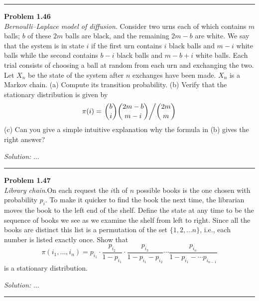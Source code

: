 \documentclass[a4paper, 11pt]{article}
\newenvironment{problem}[2][Problem]
    { \begin{mdframed}[backgroundcolor=gray!20] \textbf{#1 #2} \\}
    {  \end{mdframed}}
\newenvironment{solution}
    {\textit{Solution:}}
    {}
\begin{document}
\noindent\rule{7in}{2.8pt}
\begin{problem}{1.46}
    \textit{Bernoulli–Laplace model of diffusion}. Consider two urns each of which contains $m$ balls;
     $b$ of these $2m$ balls are black, and the remaining $2m − b$ are white. 
     We say that the system is in state $i$ if the first urn contains $i$ black balls and $m − i$ white balls 
     while the second contains $b − i$ black balls and $m − b + i$ white balls. 
     Each trial consists of choosing a ball at random from each urn and exchanging the two. 
     Let $X_n$ be the state of the system after $n$ exchanges have been made. $X_n$ is a Markov chain.
     (a) Compute its transition probability. (b) Verify that the stationary distribution is given by
    $$
        \pi(i)=\left. \binom{b}{i}\binom{2m-b}{m-i} \middle/ \binom{2m}{m} \right.
    $$
    (c) Can you give a simple intuitive explanation why the formula in (b) gives the right answer?
\end{problem}
\begin{solution}
...
\end{solution}

\noindent\rule{7in}{2.8pt}
\begin{problem}{1.47}
    \textit{Library chain}.On each request the $i$th of $n$ possible books is the one chosen with probability $p_i$. 
    To make it quicker to find the book the next time, the librarian moves the book to the left end of the shelf.
    Define the state at any time to be the sequence of books we see as we examine the shelf from left to right. 
    Since all the books are distinct this list is a permutation of the set $\{1, 2, . . . n\}$, i.e., each number is listed exactly once.
    Show that
    $$
\pi(i_1, \ldots, i_n)=p_{i_1} \cdot \frac{p_{i_2}}{1-p_{i_1}} \cdot \frac{p_{i_3}}{1-p_{i_1}-p_{i_2}} \cdots \frac{p_{i_n}}{1-p_{i_1}-\cdots p_{i_{n-1}}}
$$
is a stationary distribution.
\end{problem}
\begin{solution}
...
\end{solution}

\noindent\rule{7in}{2.8pt}
\end{document}
